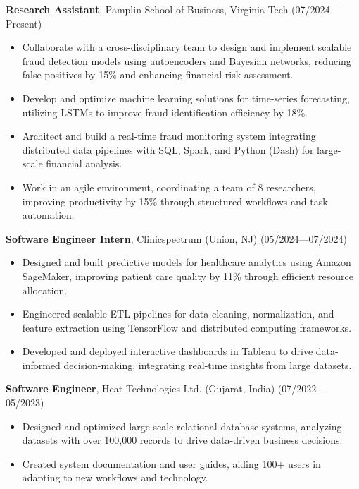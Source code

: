 \documentclass[10pt, letterpaper]{article}
\begin{document}
\textbf{Research Assistant}, Pamplin School of Business, Virginia Tech \hfill (07/2024—Present)  
\begin{itemize}[itemsep=2pt, topsep=3pt, parsep=2pt]
    \item Collaborate with a cross-disciplinary team to design and implement scalable fraud detection models using autoencoders and Bayesian networks, reducing false positives by 15\% and enhancing financial risk assessment.
    \item Develop and optimize machine learning solutions for time-series forecasting, utilizing LSTMs to improve fraud identification efficiency by 18\%.
    \item Architect and build a real-time fraud monitoring system integrating distributed data pipelines with SQL, Spark, and Python (Dash) for large-scale financial analysis.
    \item Work in an agile environment, coordinating a team of 8 researchers, improving productivity by 15\% through structured workflows and task automation.
\end{itemize}

\textbf{Software Engineer Intern}, Clinicspectrum (Union, NJ) \hfill (05/2024—07/2024)  
\begin{itemize}[itemsep=2pt, topsep=3pt, parsep=2pt]
    \item Designed and built predictive models for healthcare analytics using Amazon SageMaker, improving patient care quality by 11\% through efficient resource allocation.
    \item Engineered scalable ETL pipelines for data cleaning, normalization, and feature extraction using TensorFlow and distributed computing frameworks.
    \item Developed and deployed interactive dashboards in Tableau to drive data-informed decision-making, integrating real-time insights from large datasets.
\end{itemize}

\textbf{Software Engineer}, Heat Technologies Ltd. (Gujarat, India) \hfill (07/2022—05/2023)  
\begin{itemize}[itemsep=2pt, topsep=3pt, parsep=2pt]
    \item Designed and optimized large-scale relational database systems, analyzing datasets with over 100,000 records to drive data-driven business decisions.
    \item Created system documentation and user guides, aiding 100+ users in adapting to new workflows and technology.
\end{itemize}
\end{document}
